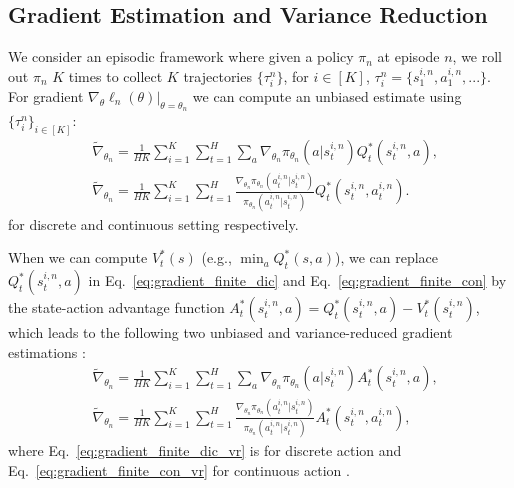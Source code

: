 \documentclass{article}
\begin{document}
\subsection{Gradient Estimation and Variance Reduction}
We consider an episodic framework where given a policy $\pi_n$ at episode $n$, we roll out $\pi_n$ $K$ times to collect $K$ trajectories $\{\tau_i^{n}\}$, for $i\in [K]$, $\tau_i^n=\{s_1^{i,n},a_1^{i,n},...\}$.  For gradient $\nabla_{\theta}\ell_n(\theta)|_{\theta=\theta_n}$ %
we can compute an unbiased estimate using $\{\tau_i^n\}_{i\in[K]}$:
\begin{align}
\label{eq:gradient_finite_dic}
&\tilde{\nabla}_{\theta_n} = \frac{1}{HK}\sum_{i=1}^K\sum_{t=1}^H\sum_{a}\nabla_{\theta_n}\pi_{\theta_n}(a|s^{i,n}_t) Q_t^*(s^{i,n}_t, a), \\
&\label{eq:gradient_finite_con}
\tilde{\nabla}_{\theta_n} = \frac{1}{HK}\sum_{i=1}^K\sum_{t=1}^H \frac{\nabla_{\theta_n}\pi_{\theta_n}(a^{i,n}_t|s_t^{i,n})}{\pi_{\theta_n}(a_t^{i,n}|s_t^{i,n})}Q_t^*(s_t^{i,n},a_t^{i,n}).
\end{align} for discrete and  continuous setting respectively. %

When we can compute $V_t^*(s)$ (e.g., $\min_a Q_t^*(s,a)$), we can replace $Q_t^*(s_t^{i,n},a)$ in Eq.~\ref{eq:gradient_finite_dic} and Eq.~\ref{eq:gradient_finite_con} by the state-action advantage function $A^*_t(s_t^{i,n},a) = Q^*_t(s_t^{i,n},a) - V_t^*(s_t^{i,n})$, which leads to the following two unbiased and variance-reduced gradient estimations \cite{greensmith2004variance}:
\begin{align}
&\tilde{\nabla}_{\theta_n} = \frac{1}{HK}\sum_{i=1}^K\sum_{t=1}^H\sum_{a}\nabla_{\theta_n}\pi_{\theta_n}(a|s^{i,n}_t) A_t^*(s^{i,n}_t, a), \label{eq:gradient_finite_dic_vr}\\
&\tilde{\nabla}_{\theta_n} = \frac{1}{HK}\sum_{i=1}^K\sum_{t=1}^H \frac{\nabla_{\theta_n}\pi_{\theta_n}(a^{i,n}_t|s_t^{i,n})}{\pi_{\theta_n}(a_t^{i,n}|s_t^{i,n})}A_t^*(s_t^{i,n},a_t^{i,n}),
\label{eq:gradient_finite_con_vr}
\end{align} where Eq.~\ref{eq:gradient_finite_dic_vr} is for discrete action and Eq.~\ref{eq:gradient_finite_con_vr} for continuous action . %
\end{document}
